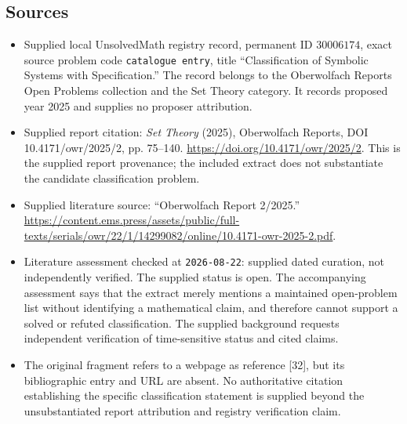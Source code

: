 \documentclass[11pt]{article}
\begin{document}
\subsection{Sources}
\begin{itemize}
\item Supplied local UnsolvedMath registry record, permanent ID \(30006174\), exact source problem code \texttt{catalogue entry}, title ``Classification of Symbolic Systems with Specification.'' The record belongs to the Oberwolfach Reports Open Problems collection and the Set Theory category. It records proposed year 2025 and supplies no proposer attribution.
\item Supplied report citation: \emph{Set Theory} (2025), Oberwolfach Reports, DOI 10.4171/owr/2025/2, pp. 75--140. \url{https://doi.org/10.4171/owr/2025/2}. This is the supplied report provenance; the included extract does not substantiate the candidate classification problem.
\item Supplied literature source: ``Oberwolfach Report 2/2025.'' \url{https://content.ems.press/assets/public/full-texts/serials/owr/22/1/14299082/online/10.4171-owr-2025-2.pdf}.
\item Literature assessment checked at \texttt{2026-08-22}: supplied dated curation, not independently verified. The supplied status is open. The accompanying assessment says that the extract merely mentions a maintained open-problem list without identifying a mathematical claim, and therefore cannot support a solved or refuted classification. The supplied background requests independent verification of time-sensitive status and cited claims.
\item The original fragment refers to a webpage as reference [32], but its bibliographic entry and URL are absent. No authoritative citation establishing the specific classification statement is supplied beyond the unsubstantiated report attribution and registry verification claim.
\end{itemize}
\end{document}
